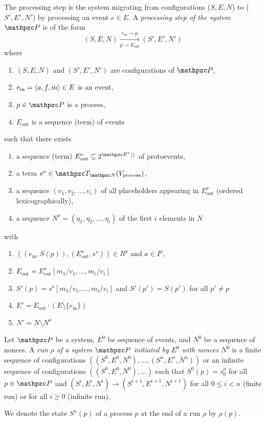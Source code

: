 \begin{definition}\label{def:processing-step}
  The processing step is the system migrating from configurations ($S, E, N$) to ($S', E', N'$) by processing an event $e \in E$.
  A \emph{processing step of the system $\process$} is of the form
  \[(S,E,N) \xrightarrow[p \rightarrow E_{\text{out}}]{e_\text{in}
    \rightarrow p} (S', E', N')\]
  where
  \begin{enumerate}
  \item $(S,E,N)$ and $(S',E',N')$ are configurations of $\process$,
  \item $e_\text{in} = \langle a, f, m\rangle \in E$ is an event,
  \item $p \in \process$ is a process,
  \item $E_{\text{out}}$ is a sequence (term) of events
  \end{enumerate}
  such that there exists 
  \begin{enumerate}
  \item a sequence (term)
    $E^\nu_{\text{out}} \subseteq 2^{\events^\nu\an{}}$ of protoevents,
  \item a term $s^\nu \in \gterms_{\nonces}(V_{\text{process}})$, 
  \item a sequence $(v_1, v_2, \dots, v_i)$ of all placeholders appearing in $E^\nu_{\text{out}}$ (ordered lexicographically),
  \item a sequence $N^\nu = (\eta_1, \eta_2, \dots, \eta_i)$ of the first $i$ elements in $N$ 
  \end{enumerate}
  with
  \begin{enumerate}
  \item $((e_{\text{in}}, S(p)), (E^\nu_{\text{out}}, s^\nu)) \in R^p$
    and $a \in I^p$,
  \item $E_{\text{out}} = E^\nu_{\text{out}}[m_1/v_1, \dots, m_i/v_i]$
  \item $S'(p) = s^\nu[m_1/v_1, \dots, m_i/v_i]$ and $S'(p') = S(p')$ for all $p' \neq p$
  \item $E' = E_{\text{out}} \cdot (E \setminus \{e_{\text{in}}\})$ 
  \item $N' = N \setminus N^\nu$ 
  \end{enumerate}
\end{definition} 

\begin{definition}[Runs]
  Let $\process$ be a system, $E^0$ be sequence of events, and $N^0$ be
  a sequence of nonces. A \emph{run $\rho$ of a system $\process$
    initiated by $E^0$ with nonces $N^0$} is a finite sequence of
  configurations $((S^0, E^0, N^0),\dots,(S^n, E^n, N^n))$ or an infinite sequence
  of configurations $((S^0, E^0, N^0),\dots)$ such that $S^0(p) = s_0^p$ for
  all $p \in \process$ and $(S^i, E^i, N^i) \xrightarrow{} (S^{i+1},
  E^{i+1}, N^{i+1})$ for all $0 \leq i < n$ (finite run) or for all $i \geq 0$  
  (infinite run).

  We denote the state $S^n(p)$ of a process $p$ at the end of a run $\rho$ by $\rho(p)$.
\end{definition}

